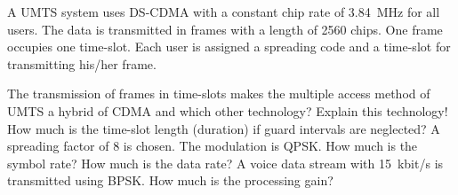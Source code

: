 \begin{question}[subtitle={3G cell phone -- UMTS}]
	A UMTS system uses DS-CDMA with a constant chip rate of \SI{3.84}{MHz} for all users. The data is transmitted in frames with a length of 2560 chips. One frame occupies one time-slot. Each user is assigned a spreading code and a time-slot for transmitting his/her frame.
	
	\begin{tasks}
		\task
		The transmission of frames in time-slots makes the multiple access method of UMTS a hybrid of CDMA and which other technology? Explain this technology!
		\task
		How much is the time-slot length (duration) if guard intervals are neglected?
		\task
		A spreading factor of 8 is chosen. The modulation is QPSK. How much is the symbol rate? How much is the data rate?
		\task
		A voice data stream with \SI{15}{kbit/s} is transmitted using BPSK. How much is the processing gain?
	\end{tasks}
\end{question}

\begin{solution}
	\begin{tasks}
	\end{tasks}
\end{solution}

%
